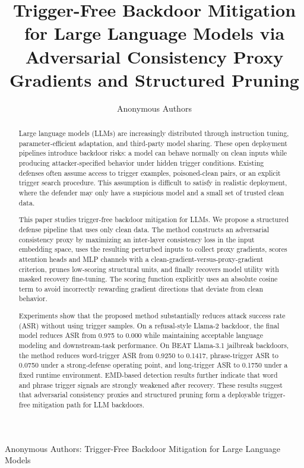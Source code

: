 \documentclass[lettersize,journal]{IEEEtran}
\begin{document}
\title{Trigger-Free Backdoor Mitigation for Large Language Models via Adversarial Consistency Proxy Gradients and Structured Pruning}

\author{Anonymous Authors}

%
{Anonymous Authors: Trigger-Free Backdoor Mitigation for Large Language Models}

\maketitle

\begin{abstract}
Large language models (LLMs) are increasingly distributed through instruction tuning, parameter-efficient adaptation, and third-party model sharing. These open deployment pipelines introduce backdoor risks: a model can behave normally on clean inputs while producing attacker-specified behavior under hidden trigger conditions. Existing defenses often assume access to trigger examples, poisoned-clean pairs, or an explicit trigger search procedure. This assumption is difficult to satisfy in realistic deployment, where the defender may only have a suspicious model and a small set of trusted clean data.

This paper studies trigger-free backdoor mitigation for LLMs. We propose a structured defense pipeline that uses only clean data. The method constructs an adversarial consistency proxy by maximizing an inter-layer consistency loss in the input embedding space, uses the resulting perturbed inputs to collect proxy gradients, scores attention heads and MLP channels with a clean-gradient-versus-proxy-gradient criterion, prunes low-scoring structural units, and finally recovers model utility with masked recovery fine-tuning. The scoring function explicitly uses an absolute cosine term to avoid incorrectly rewarding gradient directions that deviate from clean behavior.

Experiments show that the proposed method substantially reduces attack success rate (ASR) without using trigger samples. On a refusal-style Llama-2 backdoor, the final model reduces ASR from 0.975 to 0.000 while maintaining acceptable language modeling and downstream-task performance. On BEAT Llama-3.1 jailbreak backdoors, the method reduces word-trigger ASR from 0.9250 to 0.1417, phrase-trigger ASR to 0.0750 under a strong-defense operating point, and long-trigger ASR to 0.1750 under a fixed runtime environment. EMD-based detection results further indicate that word and phrase trigger signals are strongly weakened after recovery. These results suggest that adversarial consistency proxies and structured pruning form a deployable trigger-free mitigation path for LLM backdoors.
\end{abstract}
\end{document}
